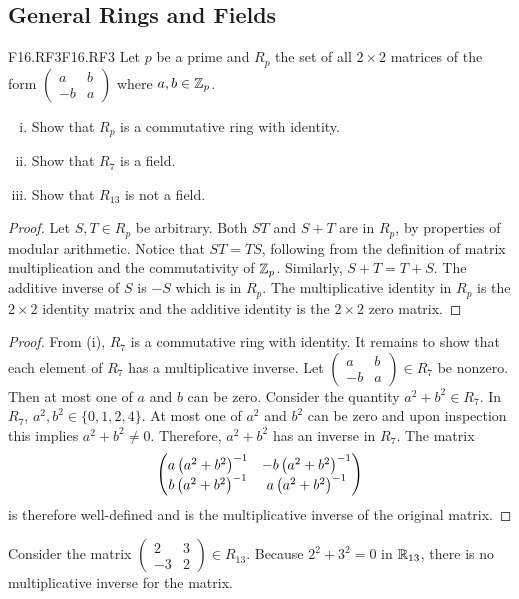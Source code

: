 \documentclass[../AlgebraQualSolutions.tex]{subfiles}
\begin{document}
\subsection{General Rings and Fields}

\begin{prob}{F16.RF3}{F16.RF3}
    Let $p$ be a prime and $R_p$ the set of all $2 \times 2$ matrices of the form $\begin{pmatrix} a & b\\ -b & a\end{pmatrix}$ where $a,b \in \mathbb{Z}_p$.

    \begin{enumerate}[(i)]
        \item Show that $R_p$ is a commutative ring with identity.
        \item Show that $R_7$ is a field.
        \item Show that $R_{13}$ is not a field.
    \end{enumerate}
\end{prob}

\begin{proof}
    Let $S,T \in R_p$ be arbitrary. Both $ST$ and $S + T$ are in $R_p$, by properties of modular arithmetic. Notice that $ST = TS$, following from the definition of matrix multiplication and the commutativity of $\mathbb{Z}_p$. Similarly, $S + T = T + S$. The additive inverse of $S$ is $-S$ which is in $R_p$. The multiplicative identity in $R_p$ is the $2 \times 2$ identity matrix and the additive identity is the $2 \times 2$ zero matrix.
\end{proof}

\begin{proof}
    From (i), $R_7$ is a commutative ring with identity. It remains to show that each element of $R_7$ has a multiplicative inverse. Let $\begin{pmatrix} a & b\\ -b & a\end{pmatrix} \in R_7$ be nonzero. Then at most one of $a$ and $b$ can be zero. Consider the quantity $a^2 + b^2 \in R_7$. In $R_7$, $a^2,b^2 \in \{0, 1, 2, 4\}$. At most one of $a^2$ and $b^2$ can be zero and upon inspection this implies $a^2 + b^2 \neq 0$. Therefore, $a^2 + b^2$ has an inverse in $R_7$. The matrix 
        \[\begin{pmatrix}
            a \left(a^2 + b^2\right)^{-1} & -b \left(a^2 + b^2\right)^{-1}\\
            b\left(a^2 + b^2\right)^{-1} & a\left(a^2 + b^2\right)^{-1}
        \end{pmatrix}\]
    is therefore well-defined and is the multiplicative inverse of the original matrix.
\end{proof}

\begin{solution}
    Consider the matrix $\begin{pmatrix} 2 & 3\\ -3 & 2\end{pmatrix} \in R_{13}$. Because $2^2 + 3^2 = 0$ in $\mathbb{R}_{13}$, there is no multiplicative inverse for the matrix.
\end{solution}
\end{document}

